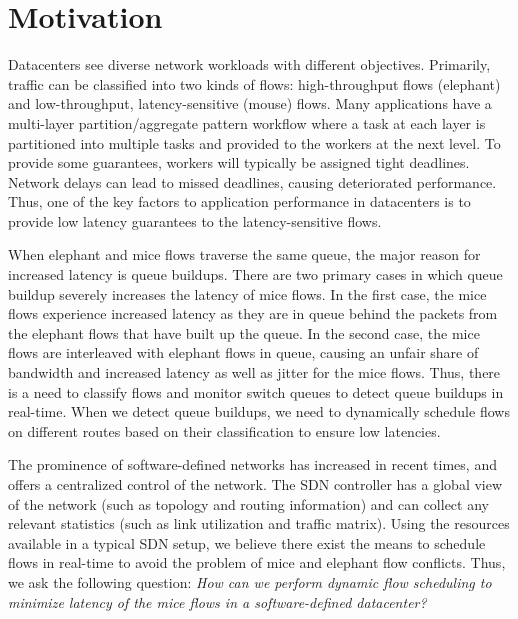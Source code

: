 \section{Motivation}
Datacenters see diverse network workloads with different objectives. Primarily, traffic can be classified into two kinds of flows: high-throughput flows (elephant) and low-throughput, latency-sensitive (mouse) flows. Many applications have a multi-layer partition/aggregate pattern workflow where a task at each layer is partitioned into multiple tasks and provided to the workers at the next level. To provide some guarantees, workers will typically be assigned tight deadlines. Network delays can lead to missed deadlines, causing deteriorated performance. Thus,
one of the key factors to application performance in datacenters is to provide low latency guarantees to the latency-sensitive flows.
 
When elephant and mice flows traverse the same queue, the major reason for increased latency is queue buildups. There are two primary cases in which queue buildup severely increases the latency of mice flows. In the first case, the mice flows experience increased latency as they are in queue behind the packets from the elephant flows that have built up the queue. In the second case, the mice flows are interleaved with elephant flows in queue, causing an unfair share of bandwidth and increased latency as well as jitter for the mice flows. Thus, there is a need to classify flows and monitor switch queues to detect queue buildups in real-time. When we detect queue buildups, we need to dynamically schedule flows on different routes based on their classification to ensure low latencies. 

The prominence of software-defined networks has increased in recent times, and offers a centralized control of the network. The SDN controller has a global view of the network (such as topology and routing information) and can collect any relevant statistics (such as link utilization and traffic matrix). Using the resources available in a typical SDN setup, we believe there exist the means to schedule flows in real-time to avoid the problem of mice and elephant flow conflicts. Thus, we ask the following question: \emph{How can we perform dynamic flow scheduling to minimize latency of the mice flows in a software-defined datacenter? }  